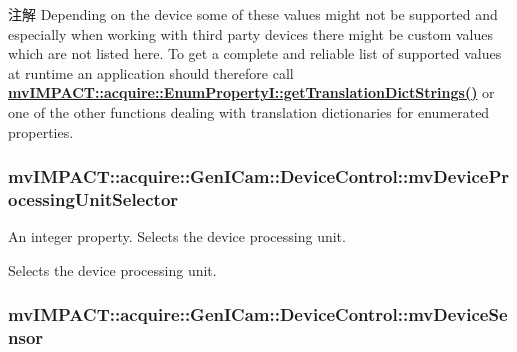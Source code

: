 \begin{DoxyNote}{注解}
Depending on the device some of these values might not be supported and especially when working with third party devices there might be custom values which are not listed here. To get a complete and reliable list of supported values at runtime an application should therefore call {\bfseries \hyperlink{classmv_i_m_p_a_c_t_1_1acquire_1_1_enum_property_i_a0ba6ccbf5ee69784d5d0b537924d26b6}{mv\+I\+M\+P\+A\+C\+T\+::acquire\+::\+Enum\+Property\+I\+::get\+Translation\+Dict\+Strings()}} or one of the other functions dealing with translation dictionaries for enumerated properties. 
\end{DoxyNote}
\hypertarget{classmv_i_m_p_a_c_t_1_1acquire_1_1_gen_i_cam_1_1_device_control_a1bcab490cda64eba7273899ba2298d81}{
\subsubsection[{mv\+Device\+Processing\+Unit\+Selector}]{ mv\+I\+M\+P\+A\+C\+T\+::acquire\+::\+Gen\+I\+Cam\+::\+Device\+Control\+::mv\+Device\+Processing\+Unit\+Selector}}\label{classmv_i_m_p_a_c_t_1_1acquire_1_1_gen_i_cam_1_1_device_control_a1bcab490cda64eba7273899ba2298d81}


An integer property. Selects the device processing unit. 

Selects the device processing unit. \hypertarget{classmv_i_m_p_a_c_t_1_1acquire_1_1_gen_i_cam_1_1_device_control_a717aab62ac9cc3db3531db15a20524cd}{
\subsubsection[{mv\+Device\+Sensor}]{ mv\+I\+M\+P\+A\+C\+T\+::acquire\+::\+Gen\+I\+Cam\+::\+Device\+Control\+::mv\+Device\+Sensor}}\label{classmv_i_m_p_a_c_t_1_1acquire_1_1_gen_i_cam_1_1_device_control_a717aab62ac9cc3db3531db15a20524cd}


